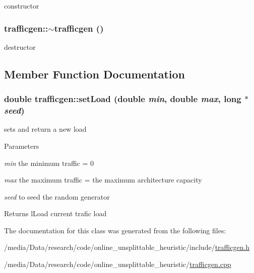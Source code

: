 constructor 

\hypertarget{classtrafficgen_ac354957233749112711e372977013674}{
\subsubsection[{$\sim$trafficgen}]{\setlength{\rightskip}{0pt plus 5cm}trafficgen::$\sim$trafficgen ()}}
\label{classtrafficgen_ac354957233749112711e372977013674}


destructor 



\subsection{Member Function Documentation}
\hypertarget{classtrafficgen_ab91f6ea4b48657844b9c925d3d1c8466}{
\subsubsection[{setLoad}]{\setlength{\rightskip}{0pt plus 5cm}double trafficgen::setLoad (double {\em min}, \/  double {\em max}, \/  long $\ast$ {\em seed})}}
\label{classtrafficgen_ab91f6ea4b48657844b9c925d3d1c8466}


sets and return a new load 


\begin{DoxyParams}{Parameters}
\item[{\em min}]the minimum traffic = 0 \item[{\em max}]the maximum traffic = the maximum architecture capacity \item[{\em seed}]to seed the random generator \end{DoxyParams}
\begin{DoxyReturn}{Returns}
lLoad current trafic load 
\end{DoxyReturn}


The documentation for this class was generated from the following files:\begin{DoxyCompactItemize}
\item 
/media/Data/research/code/online\_\-unsplittable\_\-heuristic/include/\hyperlink{trafficgen_8h}{trafficgen.h}\item 
/media/Data/research/code/online\_\-unsplittable\_\-heuristic/\hyperlink{trafficgen_8cpp}{trafficgen.cpp}\end{DoxyCompactItemize}
